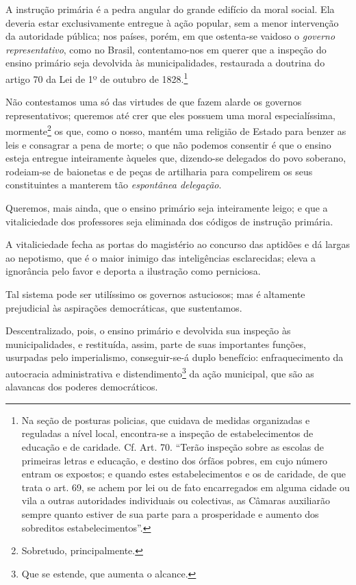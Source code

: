 A instrução primária é a pedra angular do grande edifício da moral
social. Ela deveria estar exclusivamente entregue à ação popular, sem a
menor intervenção da autoridade pública; nos países, porém, em que
ostenta-se vaidoso o \emph{governo representativo}, como no Brasil,
contentamo-nos em querer que a inspeção do ensino primário seja
devolvida às municipalidades, restaurada a doutrina do artigo 70 da Lei
de 1º de outubro de 1828.\footnote{Na seção de posturas policias, que
  cuidava de medidas organizadas e reguladas a nível local, encontra-se
  a inspeção de estabelecimentos de educação e de caridade. Cf. Art. 70.
  ``Terão inspeção sobre as escolas de primeiras letras e educação, e
  destino dos órfãos pobres, em cujo número entram os expostos; e quando
  estes estabelecimentos e os de caridade, de que trata o art. 69, se
  achem por lei ou de fato encarregados em alguma cidade ou vila a
  outras autoridades individuais ou colectivas, as Câmaras auxiliarão
  sempre quanto estiver de sua parte para a prosperidade e aumento dos
  sobreditos estabelecimentos''.}

Não contestamos uma só das virtudes de que fazem alarde os governos
representativos; queremos até crer que eles possuem uma moral
especialíssima, mormente\footnote{Sobretudo, principalmente.} os que,
como o nosso, mantém uma religião de Estado para benzer as leis e
consagrar a pena de morte; o que não podemos consentir é que o ensino
esteja entregue inteiramente àqueles que, dizendo-se delegados do povo
soberano, rodeiam-se de baionetas e de peças de artilharia para
compelirem os seus constituintes a manterem tão \emph{espontânea
delegação}.

Queremos, mais ainda, que o ensino primário seja inteiramente leigo; e
que a vitaliciedade dos professores seja eliminada dos códigos de
instrução primária.

A vitaliciedade fecha as portas do magistério ao concurso das aptidões e
dá largas ao nepotismo, que é o maior inimigo das inteligências
esclarecidas; eleva a ignorância pelo favor e deporta a ilustração como
perniciosa.

Tal sistema pode ser utilíssimo os governos astuciosos; mas é altamente
prejudicial às aspirações democráticas, que sustentamos.

Descentralizado, pois, o ensino primário e devolvida sua inspeção às
municipalidades, e restituída, assim, parte de suas importantes funções,
usurpadas pelo imperialismo, conseguir-se-á duplo benefício:
enfraquecimento da autocracia administrativa e distendimento\footnote{
  Que se estende, que aumenta o alcance.} da ação municipal, que são as
alavancas dos poderes democráticos.

